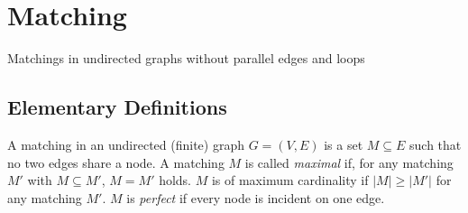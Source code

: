 \chapter{Matching}

\begin{descr}
    Matchings in undirected graphs without parallel edges and loops
\end{descr}

\section{Elementary Definitions}
\begin{definition}
A matching in an undirected (finite) graph $G=(V,E)$ is a set $M \subseteq E$ such that no two edges share a node.
A matching $M$ is called \emph{maximal} if, for any matching $M'$ with $M \subseteq M'$, $M=M'$ holds.
$M$ is of maximum cardinality if $\lvert M \rvert \ge \lvert M' \rvert $ for any matching $M'$. $M$ is \emph{perfect}
if every node is incident on one edge.
\end{definition}

